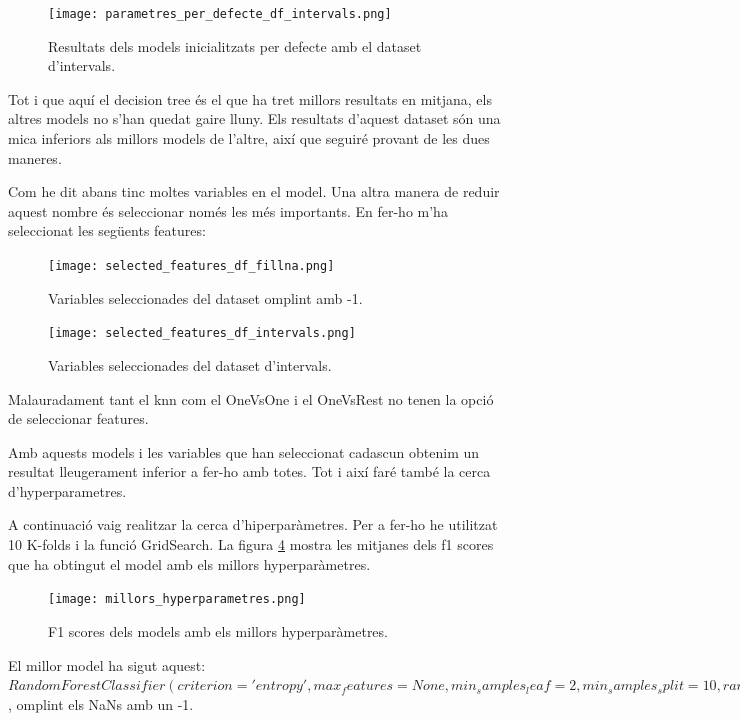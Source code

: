 \documentclass[9pt,a4paper,twoside]{tau-class/tau}
\begin{document}
    \begin{figure}[H]
        \centering
        \texttt{[image: parametres\_per\_defecte\_df\_intervals.png]}
        \caption{Resultats dels models inicialitzats per defecte amb el dataset d'intervals.}
        \label{fig:figure9}
    \end{figure}
    Tot i que aquí el decision tree és el que ha tret millors resultats en mitjana, els altres models no s'han quedat gaire lluny. Els resultats d'aquest dataset són una mica inferiors als millors models de l'altre, així que seguiré provant de les dues maneres.

    Com he dit abans tinc moltes variables en el model. Una altra manera de reduir aquest nombre és seleccionar només les més importants. En fer-ho m'ha seleccionat les següents features:
    \begin{figure}[H]
        \centering
        \texttt{[image: selected\_features\_df\_fillna.png]}
        \caption{Variables seleccionades del dataset omplint amb -1.}
        \label{fig:figure10}
    \end{figure}
    \begin{figure}[H]
        \centering
        \texttt{[image: selected\_features\_df\_intervals.png]}
        \caption{Variables seleccionades del dataset d'intervals.}
        \label{fig:figure11}
    \end{figure}

    Malauradament tant el knn com el OneVsOne i el OneVsRest no tenen la opció de seleccionar features.

    Amb aquests models i les variables que han seleccionat cadascun obtenim un resultat lleugerament inferior a fer-ho amb totes. Tot i així faré també la cerca d'hyperparametres.

    A continuació vaig realitzar la cerca d'hiperparàmetres. Per a fer-ho he utilitzat 10 K-folds i la funció GridSearch. La figura \ref{fig:figure12} mostra les mitjanes dels f1 scores que ha obtingut el model amb els millors hyperparàmetres.


    \begin{figure}[H]
        \centering
        \texttt{[image: millors\_hyperparametres.png]}
        \caption{F1 scores dels models amb els millors hyperparàmetres.}
        \label{fig:figure12}
    \end{figure}
    
    El millor model ha sigut aquest: $RandomForestClassifier(criterion='entropy', max_features=None,
    min_samples_leaf=2, min_samples_split=10,
    random_state=20)$, omplint els NaNs amb un -1.
\end{document}
